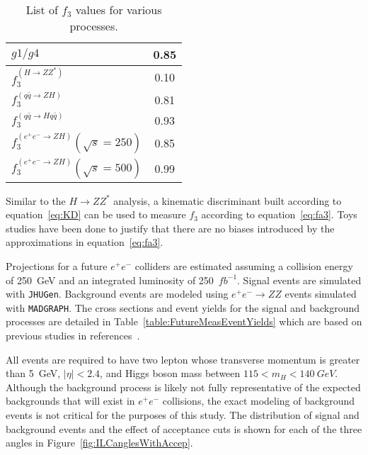 \begin{table}
\begin{center}
\begin{tabular}{l|c}
\large $g1/g4$                   & 0.85  \vspace{.1cm} \\
\hline\hline                          
\large $f_3^{(H\to ZZ^*)}$          & 0.10  \vspace{.1cm} \\
\large $f_3^{(q\bar{q}\to ZH)}$      & 0.81  \vspace{.1cm} \\ 
\large $f_3^{(q\bar{q}\to Hq\bar{q})}$ & 0.93  \vspace{.1cm} \\
\large $f_3^{(e^+e^-\to ZH)}(\sqrt{s}=250)$ & 0.85   \vspace{.1cm} \\
\large $f_3^{(e^+e^-\to ZH)}(\sqrt{s}=500)$ & 0.99  \vspace{.1cm} \\
\hline
\hline
\end{tabular}
\end{center}
\label{table:fa3Conversion}
\caption{List of $f_3$ values for various processes.}
\end{table}

Similar to the $H\to ZZ^*$ analysis, a kinematic discriminant 
built according to equation~\ref{eq:KD} can be used to measure 
$f_3$ according to equation~\ref{eq:fa3}.  
Toys studies have been done to justify that there are no
biases introduced by the approximations in equation~\ref{eq:fa3}. 

Projections for a future $e^+e^-$
colliders are estimated assuming a collision energy  
of 250~GeV and an integrated luminosity of 250~$fb^{-1}$.
Signal events are simulated with \verb+JHUGen+.  Background events
are modeled using $e^+e^-\to ZZ$ events simulated with
\verb+MADGRAPH+.  
The cross sections and event yields for the signal and
background processes are detailed in 
Table~\ref{table:FutureMeasEventYields}
which are based on previous studies in references~\cite{???}.

All events are required to have two lepton whose 
transverse momentum is greater than 5~GeV, $|\eta|<2.4$, and 
Higgs boson mass between $115<m_H<140~GeV$.  Although
the background process is likely not fully representative
of the expected backgrounds that will exist in $e^+e^-$
collisions, the exact modeling of background events is not
critical for the purposes of this study.
The distribution of signal and background events and the effect
of acceptance cuts is shown for each of the three angles in 
Figure~\ref{fig:ILCanglesWithAccep}. 

